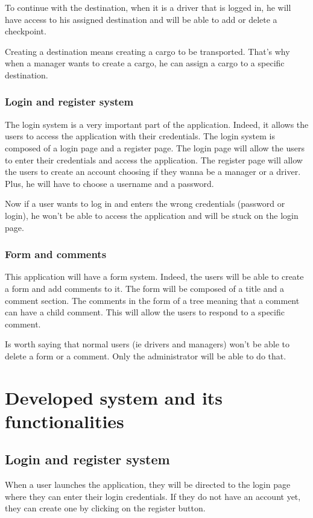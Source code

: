 \documentclass{article}
\begin{document}
To continue with the destination, when it is a driver that is logged in, he will have access
to his assigned destination and will be able to add or delete a checkpoint.

Creating a destination means creating a cargo to be transported. That's why when a manager wants
to create a cargo, he can assign a cargo to a specific destination.

\subsubsection{Login and register system}
The login system is a very important part of the application. Indeed, it allows the users to
access the application with their credentials. The login system is composed of a login
page and a register page. The login page will allow the users to enter their credentials and
access the application. The register page will allow the users to create an account choosing if 
they wanna be a manager or a driver. Plus, he will have to choose a username and a password.

Now if a user wants to log in and enters the wrong credentials (password or login), he won't
be able to access the application and will be stuck on the login page. 


\subsubsection{Form and comments}
This application will have a form system. Indeed, the users will be able to create a form
and add comments to it. The form will be composed of a title and a comment section. The comments
in the form of a tree meaning that a comment can have a child comment. This will allow the users
to respond to a specific comment.

Is worth saying that normal users (ie drivers and managers) won't be able to delete a form
or a comment. Only the administrator will be able to do that.


\section{Developed system and its functionalities}
\subsection{Login and register system}
When a user launches the application, they will be directed to the login page where they 
can enter their login credentials. If they do not have an account yet, they can create one 
by clicking on the register button.
\end{document}
